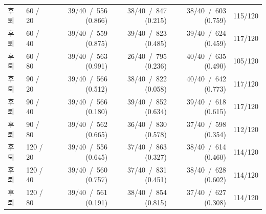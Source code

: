 \begin{tabular}{llrrrr}
후퇴 & 60 / 20 & 39/40 \,/\, 556 (0.866) & 38/40 \,/\, 847 (0.215) & 38/40 \,/\, 603 (0.759) & 115/120 \\
후퇴 & 60 / 40 & 39/40 \,/\, 559 (0.875) & 39/40 \,/\, 823 (0.485) & 39/40 \,/\, 624 (0.459) & 117/120 \\
후퇴 & 60 / 80 & 39/40 \,/\, 563 (0.991) & 26/40 \,/\, 795 (0.236) & 40/40 \,/\, 635 (0.490) & 105/120 \\
후퇴 & 90 / 20 & 39/40 \,/\, 566 (0.512) & 38/40 \,/\, 822 (0.058) & 40/40 \,/\, 642 (0.773) & 117/120 \\
후퇴 & 90 / 40 & 39/40 \,/\, 566 (0.180) & 39/40 \,/\, 852 (0.634) & 39/40 \,/\, 618 (0.615) & 117/120 \\
후퇴 & 90 / 80 & 39/40 \,/\, 562 (0.665) & 36/40 \,/\, 830 (0.578) & 37/40 \,/\, 598 (0.354) & 112/120 \\
후퇴 & 120 / 20 & 39/40 \,/\, 556 (0.645) & 37/40 \,/\, 863 (0.327) & 38/40 \,/\, 614 (0.460) & 114/120 \\
후퇴 & 120 / 40 & 39/40 \,/\, 560 (0.757) & 37/40 \,/\, 831 (0.451) & 38/40 \,/\, 628 (0.602) & 114/120 \\
후퇴 & 120 / 80 & 39/40 \,/\, 561 (0.191) & 38/40 \,/\, 854 (0.815) & 37/40 \,/\, 627 (0.308) & 114/120 \\
\bottomrule
\end{tabular}%
